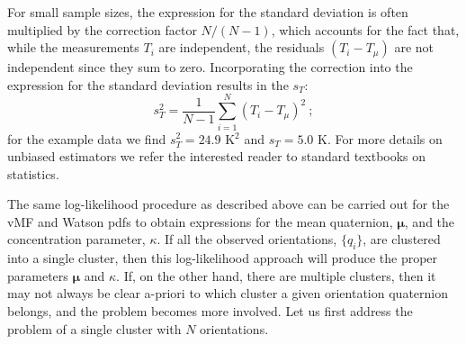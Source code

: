 For small sample sizes, the expression for the standard deviation is often multiplied by the correction factor $N/(N-1)$, which accounts for the fact that, while the measurements $T_i$ are independent, the residuals $(T_i-T_{\mu})$ are not independent since they sum to zero.  Incorporating the correction into the expression for the standard deviation results in the  $s_T$:
\begin{equation}
	s_T^2 = \frac{1}{N-1} \sum_{i=1}^N (T_i-T_{\mu})^2\ ;
\end{equation}
for the example data we find $s_T^2= 24.9$ K$^2$ and $s_T=5.0$ K.  For more details on unbiased estimators we refer the interested reader to standard textbooks on statistics.

The same log-likelihood procedure as described above can be carried out for the vMF and Watson pdfs to obtain expressions for the mean quaternion, $\bm{\mu}$, and the concentration parameter, $\kappa$.  If all the observed orientations, $\{q_i\}$, are clustered into a single cluster, then this log-likelihood approach will produce the proper parameters $\bm{\mu}$ and $\kappa$.  If, on the other hand, there are multiple clusters, then it may not always be clear a-priori to which cluster a given orientation quaternion belongs, and the problem becomes more involved.  Let us first address the problem of a single cluster with $N$ orientations.

